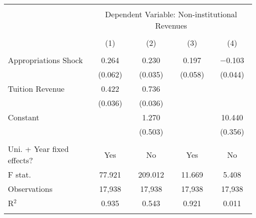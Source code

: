 
\begin{tabular}{@{\extracolsep{5pt}}lcccc} 
\\[-1.8ex]\hline 
\hline \\[-1.8ex] 
 & \multicolumn{4}{c}{Dependent Variable: Non-institutional Revenues} \\ 
\cline{2-5} 
\\[-1.8ex] & (1) & (2) & (3) & (4)\\ 
\hline \\[-1.8ex] 
 Appropriations Shock & 0.264 & 0.230 & 0.197 & $-$0.103 \\ 
  & (0.062) & (0.035) & (0.058) & (0.044) \\ 
  Tuition Revenue & 0.422 & 0.736 &  &  \\ 
  & (0.036) & (0.036) &  &  \\ 
  Constant &  & 1.270 &  & 10.440 \\ 
  &  & (0.503) &  & (0.356) \\ 
 \hline \\[-1.8ex] 
Uni. + Year fixed effects? & Yes & No & Yes & No \\ 
F stat. & 77.921 & 209.012 & 11.669 & 5.408 \\ 
Observations & 17,938 & 17,938 & 17,938 & 17,938 \\ 
R$^{2}$ & 0.935 & 0.543 & 0.921 & 0.011 \\ 
\hline 
\hline \\[-1.8ex] 
\end{tabular} 
